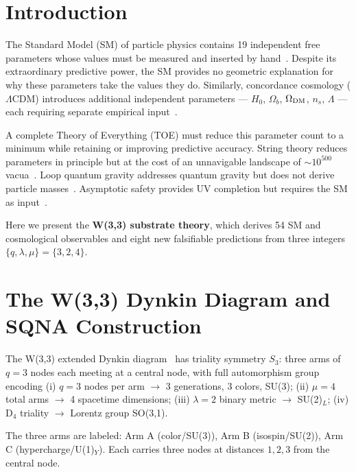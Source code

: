 \documentclass[aps,prl,twocolumn,superscriptaddress,nofootinbib]{revtex4-2}
\begin{document}
\section{Introduction}

The Standard Model (SM) of particle physics contains 19 independent free
parameters whose values must be measured and inserted by hand~\cite{PDG2024}.
Despite its extraordinary predictive power, the SM provides no geometric
explanation for why these parameters take the values they do.
Similarly, concordance cosmology ($\Lambda$CDM) introduces additional
independent parameters --- $H_0$, $\Omega_b$, $\Omega_{\rm DM}$, $n_s$,
$\Lambda$ --- each requiring separate empirical input~\cite{Planck2020}.

A complete Theory of Everything (TOE) must reduce this parameter count
to a minimum while retaining or improving predictive accuracy.
String theory reduces parameters in principle but at the cost of an
unnavigable landscape of $\sim 10^{500}$ vacua~\cite{Susskind2003}.
Loop quantum gravity addresses quantum gravity but does not derive
particle masses~\cite{Rovelli2004}.
Asymptotic safety provides UV completion but requires the SM as
input~\cite{Wetterich2019}.

Here we present the \textbf{W(3,3) substrate theory}, which derives 54
SM and cosmological observables and eight new falsifiable predictions
from three integers $\{q,\lambda,\mu\}=\{3,2,4\}$.

\section{The W(3,3) Dynkin Diagram and SQNA Construction}

The W(3,3) extended Dynkin diagram~\cite{Kac1990} has triality symmetry $S_3$:
three arms of $q=3$ nodes each meeting at a central node,
with full automorphism group encoding
(i) $q=3$ nodes per arm $\to$ 3 generations, 3 colors, SU(3);
(ii) $\mu=4$ total arms $\to$ 4 spacetime dimensions;
(iii) $\lambda=2$ binary metric $\to$ SU(2)$_L$;
(iv) D$_4$ triality $\to$ Lorentz group SO(3,1).

The three arms are labeled: Arm A (color/SU(3)), Arm B (isospin/SU(2)),
Arm C (hypercharge/U(1)$_Y$). Each carries three nodes at distances
$1,2,3$ from the central node.
\end{document}

